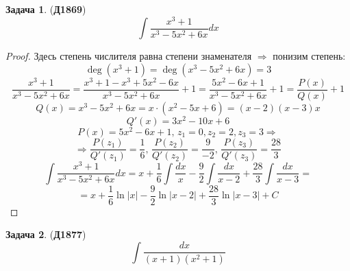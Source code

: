 \documentclass[12pt]{article}
\theoremstyle{definition}
\newtheorem{problem}{Задача}
\DeclareMathOperator{\dint}{\displaystyle\int}
\begin{document}
\begin{problem}(\textbf{Д1869})
	$$
		\dint \dfrac{x^3 + 1}{x^3 - 5x^2 + 6x }dx
	$$
\end{problem}
\begin{proof}
	Здесь степень числителя равна степени знаменателя $\Rightarrow$ понизим степень:
	$$
		\deg{(x^3 + 1)} = \deg{(x^3 - 5x^2 + 6x)} = 3
	$$
	$$
		\dfrac{x^3 + 1}{x^3 - 5x^2 + 6x } = \dfrac{x^3 + 1 - x^3 + 5x^2 - 6x}{x^3 - 5x^2 + 6x } + 1 = \dfrac{5x^2 - 6x +1}{x^3 - 5x^2 + 6x} + 1 = \dfrac{P(x)}{Q(x)} + 1
	$$
	$$
		Q(x) = x^3 - 5x^2 + 6x = x{\cdot}(x^2 - 5x + 6) = (x - 2)(x - 3)x
	$$
	$$
		Q'(x) = 3x^2 - 10x + 6 
	$$
	$$
		P(x) = 5x^2 - 6x + 1, \,  z_1 = 0, z_2 = 2, z_3 = 3 \Rightarrow 
	$$
	$$
		\Rightarrow \dfrac{P(z_1)}{Q'(z_1)} = \dfrac{1}{6}, \, \dfrac{P(z_2)}{Q'(z_2)} = \dfrac{9}{-2}, \, \dfrac{P(z_3)}{Q'(z_3)} = \dfrac{28}{3}
	$$
	$$
		\dint \dfrac{x^3 + 1}{x^3 - 5x^2 + 6x }dx = x + \dfrac{1}{6}\dint\dfrac{dx}{x} - \dfrac{9}{2}\dint\dfrac{dx}{x-2} + \dfrac{28}{3}\dint\dfrac{dx}{x-3} = 
	$$
	$$
		= x + \dfrac{1}{6}\ln{|x|} - \dfrac{9}{2}\ln{|x - 2|} + \dfrac{28}{3}\ln{|x - 3|} + C
	$$
\end{proof}
\newpage
\begin{problem}(\textbf{Д1877})
	$$
		\dint \dfrac{dx}{(x + 1)(x^2 + 1)}
	$$
\end{problem}
\end{document}
